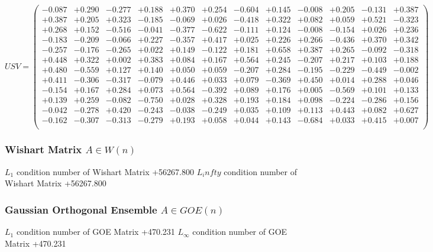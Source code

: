 \documentclass[9pt]{article}
\theoremstyle{plain}
\theoremstyle{definition}
\theoremstyle{remark}
\numberwithin{equation}{section}
\begin{document}
$U S V = \left(
\begin{array}{
cccccccccccc}
-0.087 & +0.290 & -0.277 & +0.188 & +0.370 & +0.254 & -0.604 & +0.145 & -0.008 & +0.205 & -0.131 & +0.387 \\
+0.387 & +0.205 & +0.323 & -0.185 & -0.069 & +0.026 & -0.418 & +0.322 & +0.082 & +0.059 & +0.521 & -0.323 \\
+0.268 & +0.152 & -0.516 & -0.041 & -0.377 & -0.622 & -0.111 & +0.124 & -0.008 & -0.154 & +0.026 & +0.236 \\
-0.183 & -0.209 & -0.066 & +0.227 & -0.357 & +0.417 & +0.025 & +0.226 & +0.266 & -0.436 & +0.370 & +0.342 \\
-0.257 & -0.176 & -0.265 & +0.022 & +0.149 & -0.122 & +0.181 & +0.658 & +0.387 & +0.265 & -0.092 & -0.318 \\
+0.448 & +0.322 & +0.002 & +0.383 & +0.084 & +0.167 & +0.564 & +0.245 & -0.207 & +0.217 & +0.103 & +0.188 \\
+0.480 & -0.559 & +0.127 & +0.140 & +0.050 & +0.059 & -0.207 & +0.284 & -0.195 & -0.229 & -0.449 & -0.002 \\
+0.411 & -0.306 & -0.317 & -0.079 & +0.446 & +0.033 & +0.079 & -0.369 & +0.450 & +0.014 & +0.288 & +0.046 \\
-0.154 & +0.167 & +0.284 & +0.073 & +0.564 & -0.392 & +0.089 & +0.176 & +0.005 & -0.569 & +0.101 & +0.133 \\
+0.139 & +0.259 & -0.082 & -0.750 & +0.028 & +0.328 & +0.193 & +0.184 & +0.098 & -0.224 & -0.286 & +0.156 \\
-0.042 & -0.278 & +0.420 & -0.243 & -0.038 & -0.249 & +0.035 & +0.109 & +0.113 & +0.443 & +0.082 & +0.627 \\
-0.162 & -0.307 & -0.313 & -0.279 & +0.193 & +0.058 & +0.044 & +0.143 & -0.684 & +0.033 & +0.415 & +0.007 \\
\end{array}
\right)$ \newline 

\subsubsection{Wishart Matrix $A \in W(n)$}
$L_1$ condition number of Wishart Matrix +56267.800
$L_infty$ condition number of Wishart Matrix +56267.800
\subsubsection{Gaussian Orthogonal Ensemble $A \in GOE(n)$}
$L_1$ condition number of GOE Matrix +470.231
$L_\infty$ condition number of GOE Matrix +470.231
\end{document}
